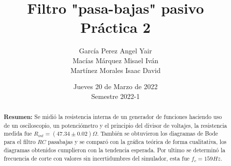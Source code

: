 \documentclass[DIV=calc, paper=a4, fontsize=11pt]{scrartcl}
\title{Filtro "pasa-bajas" pasivo\\ %
Práctica 2}
\author{García Perez Angel Yair\\
Macías Márquez Misael Iván \\
Martínez Morales Isaac David }
\date{Jueves 20 de Marzo de 2022\\Semestre 2022-1}
\begin{document}
\maketitle


\begin{abstract}
 
\textbf{Resumen:} Se midió la resistencia interna de un generador de funciones haciendo uso de un osciloscopio, un potenciómetro y el principio del divisor de voltajes, la resistencia medida fue $R_{int} = (47.34 \pm 0.02) \Omega$. También se obtuvieron los diagramas de Bode para el filtro $RC$ pasabajas y se comparó con la gráfica teórica de forma cualitativa, los diagramas obtenidos cumplieron con la tendencia esperada. Por ultimo se determinó la frecuencia de corte con valores sin incertidumbres del simulador, esta fue $f_c = 159 Hz$.


\end{abstract}
\end{document}

